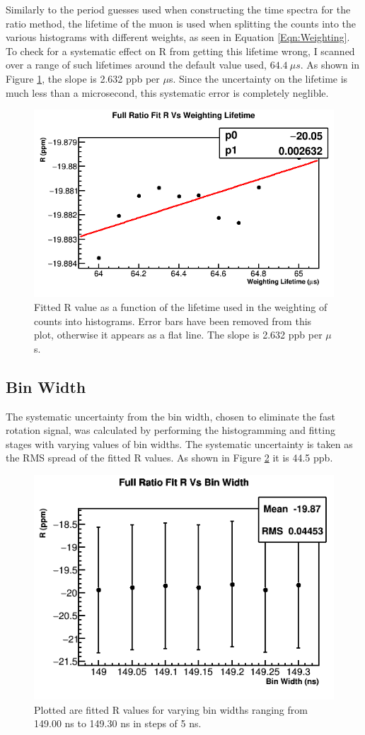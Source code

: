 		Similarly to the \gmtwo period guesses used when constructing the time spectra for the ratio method, the lifetime of the muon is used when splitting the counts into the various histograms with different weights, as seen in Equation \ref{Eqn:Weighting}. To check for a systematic effect on R from getting this lifetime wrong, I scanned over a range of such lifetimes around the default value used, $\SI{64.4}{\mu s}$. As shown in Figure \ref{fig:weightingLifetime}, the slope is 2.632 ppb per $\mu$s. Since the uncertainty on the lifetime is much less than a microsecond, this systematic error is completely neglible.

		\begin{figure}[]
			\centering
			\includegraphics[width=.6\textwidth]{RatioCBO_R_Vs_weightingLifetime_Canv}
		    \caption[weightingLifetime]{Fitted R value as a function of the lifetime used in the weighting of counts into histograms. Error bars have been removed from this plot, otherwise it appears as a flat line. The slope is 2.632 ppb per $\mu$s.}
		    \label{fig:weightingLifetime}
		\end{figure}


	\subsection{Bin Width}

		The systematic uncertainty from the bin width, chosen to eliminate the fast rotation signal, was calculated by performing the histogramming and fitting stages with varying values of bin widths. The systematic uncertainty is taken as the RMS spread of the fitted R values. As shown in Figure \ref{fig:BinWidth} it is 44.5 ppb.

		\begin{figure}[]
			\centering
			\includegraphics[width=.6\textwidth]{BinWidthComparison_R}
		    \caption[BinWidth]{Plotted are fitted R values for varying bin widths ranging from 149.00 ns to 149.30 ns in steps of 5 ns.}
		    \label{fig:BinWidth}
		\end{figure}

